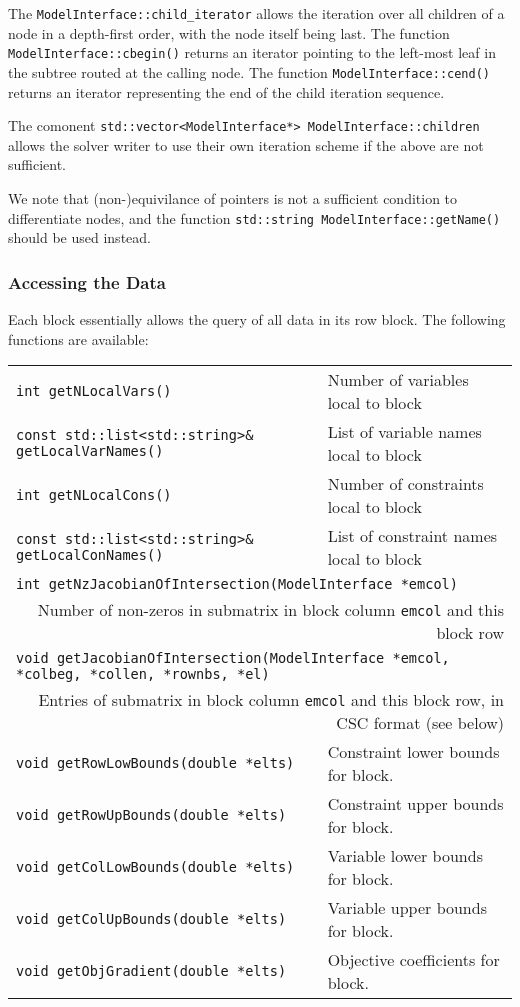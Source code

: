 \documentclass[10pt,a4paper]{book}
\begin{document}
The {\tt ModelInterface::child\_iterator} allows the iteration over all children
of a node in a depth-first order, with the node itself being last. The function
{\tt ModelInterface::cbegin()} returns an iterator pointing to the left-most
leaf in the subtree routed at the calling node. The function 
{\tt ModelInterface::cend()} returns an iterator representing the end of the
child iteration sequence.

The comonent {\tt std::vector<ModelInterface*> ModelInterface::children} allows
the solver writer to use their own iteration scheme if the above are not
sufficient.

We note that (non-)equivilance of pointers is not a sufficient condition to
differentiate nodes, and the function {\tt std::string ModelInterface::getName()} should be used instead.

\subsubsection{Accessing the Data}
Each block essentially allows the query of all data in its row block. The
following functions are available:
\begin{tabular}{ll}
{\tt int getNLocalVars()} & 
   Number of variables local to block \\
{\tt const std::list<std::string>\& getLocalVarNames()} &
   List of variable names local to block \\
{\tt int getNLocalCons()} & 
   Number of constraints local to block \\
{\tt const std::list<std::string>\& getLocalConNames()} &
   List of constraint names local to block \\
\multicolumn{2}{l}{\tt int getNzJacobianOfIntersection(ModelInterface *emcol)}\\
\multicolumn{2}{r}{Number of non-zeros in submatrix in block column {\tt emcol}
   and this block row} \\
\multicolumn{2}{l}{\tt void getJacobianOfIntersection(ModelInterface *emcol,
      *colbeg, *collen, *rownbs, *el)} \\
\multicolumn{2}{r}{Entries of submatrix in block column {\tt emcol} and this
   block row, in CSC format (see below)} \\
{\tt void getRowLowBounds(double *elts)} &
   Constraint lower bounds for block. \\
{\tt void getRowUpBounds(double *elts)} &
   Constraint upper bounds for block. \\
{\tt void getColLowBounds(double *elts)} &
   Variable lower bounds for block. \\
{\tt void getColUpBounds(double *elts)} &
   Variable upper bounds for block. \\
{\tt void getObjGradient(double *elts)} &
   Objective coefficients for block.
\end{tabular}
\end{document}
